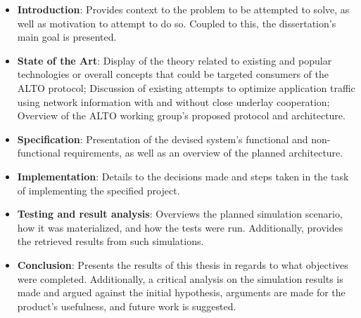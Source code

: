 \begin{itemize}
    \item \textbf{Introduction}: Provides context to the problem to be attempted to solve, as well as motivation to attempt to do so. Coupled to this, the dissertation's main goal is presented.
    \item \textbf{State of the Art}: Display of the theory related to existing and popular technologies or overall concepts that could be targeted consumers of the ALTO protocol; Discussion of existing attempts to optimize application traffic using network information with and without close underlay cooperation; Overview of the ALTO working group's proposed protocol and architecture.
    \item \textbf{Specification}: Presentation of the devised system's functional and non-functional requirements, as well as an overview of the planned architecture.
    \item \textbf{Implementation}: Details to the decisions made and steps taken in the task of implementing the specified project.
    \item \textbf{Testing and result analysis}: Overviews the planned simulation scenario, how it was materialized, and how the tests were run. Additionally, provides the retrieved results from such simulations.
    \item \textbf{Conclusion}: Presents the results of this thesis in regards to what objectives were completed. Additionally, a critical analysis on the simulation results is made and argued against the initial hypothesis, arguments are made for the product's usefulness, and future work is suggested.
\end{itemize}{}

